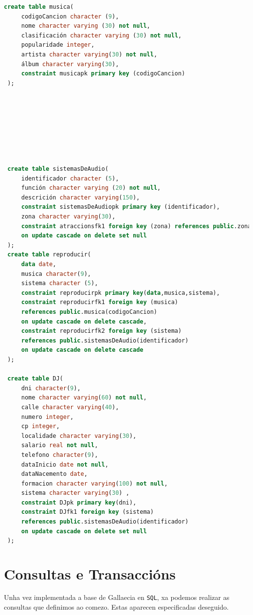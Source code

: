 \documentclass[12pt,a4paper]{book}
\theoremstyle{definition}
\theoremstyle{break}
\begin{document}
\begin{lstlisting}[language=sql,style=sql,tabsize=5,  escapechar={|},
		keywordstyle=\color{blue}\ttfamily,
		stringstyle=\color{red}\ttfamily]
 create table musica(
	 codigoCancion character (9),
	 nome character varying (30) not null,
	 clasificación character varying (30) not null,
	 popularidade integer,
	 artista character varying(30) not null,
	 álbum character varying(30),
	 constraint musicapk primary key (codigoCancion)
 );
 
 
 
 
 
 
 
 
 create table sistemasDeAudio(
	 identificador character (5),
	 función character varying (20) not null,
	 descrición character varying(150),
	 constraint sistemasDeAudiopk primary key (identificador),
	 zona character varying(30),
	 constraint atraccionsfk1 foreign key (zona) references public.zonas(nome)
	 on update cascade on delete set null
 );
 create table reproducir(
	 data date,
	 musica character(9),
	 sistema character (5),
	 constraint reproducirpk primary key(data,musica,sistema),
	 constraint reproducirfk1 foreign key (musica)
	 references public.musica(codigoCancion)
	 on update cascade on delete cascade,
	 constraint reproducirfk2 foreign key (sistema)
	 references public.sistemasDeAudio(identificador)
	 on update cascade on delete cascade
 );
 
 create table DJ(
	 dni character(9),
	 nome character varying(60) not null,
	 calle character varying(40),
	 numero integer,
	 cp integer,
	 localidade character varying(30),
	 salario real not null,
	 telefono character(9),
	 dataInicio date not null,
	 dataNacemento date,
	 formacion character varying(100) not null,
	 sistema character varying(30) ,
	 constraint DJpk primary key(dni),
	 constraint DJfk1 foreign key (sistema)
	 references public.sistemasDeAudio(identificador)
	 on update cascade on delete set null
 );
	\end{lstlisting}
	
	\section{Consultas e Transaccións}
	Unha vez implementada a base de {\logo Gallaecia} en \texttt{SQL}, xa podemos realizar as consultas que definimos ao comezo. Estas aparecen especificadas deseguido.
	
\end{document}
